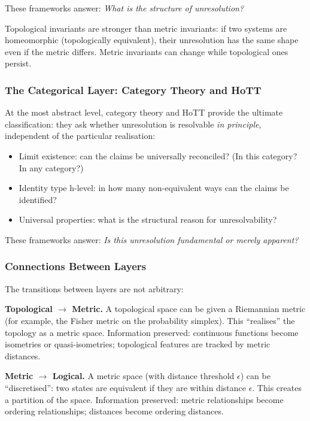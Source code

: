 \documentclass[11pt,letterpaper]{article}
\theoremstyle{definition}
\theoremstyle{remark}
\begin{document}
These frameworks answer: \emph{What is the structure of unresolution?}

Topological invariants are stronger than metric invariants: if two systems are homeomorphic (topologically equivalent), their unresolution has the same shape even if the metric differs. Metric invariants can change while topological ones persist.

\subsubsection*{The Categorical Layer: Category Theory and HoTT}

At the most abstract level, category theory and HoTT provide the ultimate classification: they ask whether unresolution is resolvable \emph{in principle}, independent of the particular realisation:
\begin{itemize}
\item Limit existence: can the claims be universally reconciled? (In this category? In any category?)
\item Identity type h-level: in how many non-equivalent ways can the claims be identified?
\item Universal properties: what is the structural reason for unresolvability?
\end{itemize}

These frameworks answer: \emph{Is this unresolution fundamental or merely apparent?}

\subsubsection*{Connections Between Layers}

The transitions between layers are not arbitrary:

\textbf{Topological $\to$ Metric.} A topological space can be given a Riemannian metric (for example, the Fisher metric on the probability simplex). This ``realises'' the topology as a metric space. Information preserved: continuous functions become isometries or quasi-isometries; topological features are tracked by metric distances.

\textbf{Metric $\to$ Logical.} A metric space (with distance threshold $\epsilon$) can be ``discretised'': two states are equivalent if they are within distance $\epsilon$. This creates a partition of the space. Information preserved: metric relationships become ordering relationships; distances become ordering distances.
\end{document}
